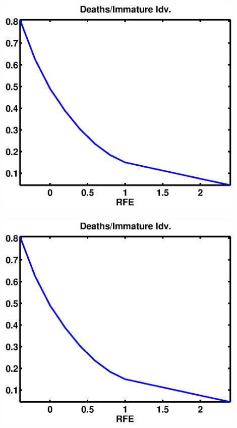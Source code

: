 \documentclass[mathserif]{beamer}
\begin{document}
\begin{frame}
\begin{center}
\frametitle{\insertsection}
\includegraphics[width=0.9\textwidth]{mortMat}
\end{center}
\end{frame}

\begin{frame}
\begin{center}
\frametitle{\insertsection}
\includegraphics[width=0.9\textwidth]{mortImm}
\end{center}
\end{frame}
\end{document}
